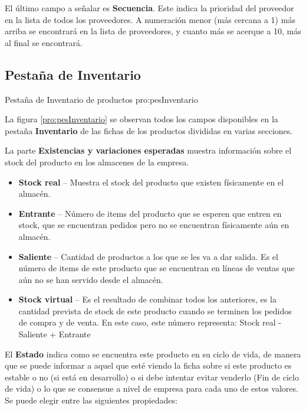El último campo a señalar es \textbf{Secuencia}. Este indica la prioridad del proveedor en la lista de todos los proveedores. A numeración menor (más cercana a 1) más arriba se encontrará en la lista de proveedores, y cuanto más se acerque a 10, más al final se encontrará.





\subsection{Pestaña de Inventario}

{Pestaña de Inventario de productos}
{pro:pesInventario}

La figura \ref{pro:pesInventario} se observan todos los campos disponibles en la pestaña \textbf{Inventario} de las fichas de los productos divididas en varias secciones.

La parte \textbf{Existencias y variaciones esperadas} muestra información sobre el stock del producto en los almacenes de la empresa. 

\begin{itemize}

  \item \textbf{Stock real} -- Muestra el stock del producto que existen físicamente en el almacén.
  \item \textbf{Entrante} -- Número de items del producto que se esperen que entren en stock, que se encuentran pedidos pero no se encuentran físicamente aún en almacén.
  \item \textbf{Saliente} -- Cantidad de productos a los que se les va a dar salida. Es el número de items de este producto que se encuentran en líneas de ventas que aún no se han servido desde el almacén.
  \item \textbf{Stock virtual} -- Es el resultado de combinar todos los anteriores, es la cantidad prevista de stock de este producto cuando se terminen los pedidos de compra y de venta. En este caso, este número representa: Stock real - Saliente + Entrante

\end{itemize}


El \textbf{Estado} indica como se encuentra este producto en su ciclo de vida, de manera que se puede informar a aquel que esté viendo la ficha sobre si este producto es estable o no (si está en desarrollo) o si debe intentar evitar venderlo (Fin de ciclo de vida) o lo que se consensue a nivel de empresa para cada uno de estos valores. Se puede elegir entre las siguientes propiedades:

